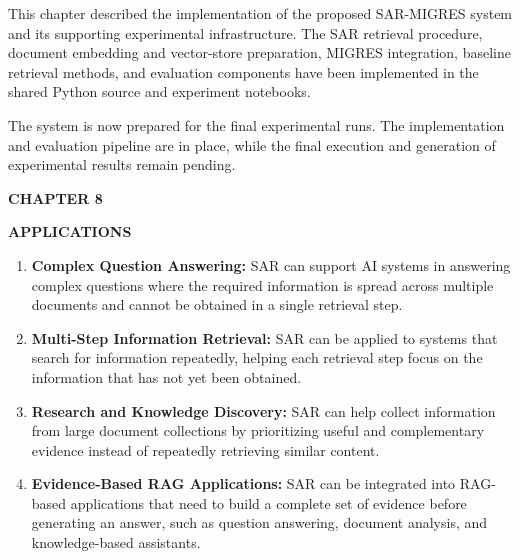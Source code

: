 \documentclass[12pt,a4paper]{report}
\newcommand{\chaptertitle}[2]{
    \begin{flushright}
        {\fontsize{22}{26}\selectfont\bfseries CHAPTER #1\par}
        \vspace{0.10in}
        {\fontsize{22}{26}\selectfont\bfseries #2\par}
    \end{flushright}
    \vspace{0.12in}
}
\begin{document}
This chapter described the implementation of the proposed SAR-MIGRES
system and its supporting experimental infrastructure. The SAR retrieval
procedure, document embedding and vector-store preparation, MIGRES
integration, baseline retrieval methods, and evaluation components have
been implemented in the shared Python source and experiment notebooks.

The system is now prepared for the final experimental runs. The
implementation and evaluation pipeline are in place, while the final
execution and generation of experimental results remain pending.

\label{ch:7:end}

\clearpage


\chaptertitle{8}{APPLICATIONS}
\label{ch:8}
\justifying

\begin{enumerate}[leftmargin=0.30in,itemsep=0.12in]

\item
\textbf{Complex Question Answering:} SAR can support AI systems in answering complex questions where the required information is spread across multiple documents and cannot be obtained in a single retrieval step.

\item
\textbf{Multi-Step Information Retrieval:} SAR can be applied to systems that search for information repeatedly, helping each retrieval step focus on the information that has not yet been obtained.

\item
\textbf{Research and Knowledge Discovery:} SAR can help collect information from large document collections by prioritizing useful and complementary evidence instead of repeatedly retrieving similar content.

\item
\textbf{Evidence-Based RAG Applications:} SAR can be integrated into RAG-based applications that need to build a complete set of evidence before generating an answer, such as question answering, document analysis, and knowledge-based assistants.

\end{enumerate}
\clearpage


\end{document}
